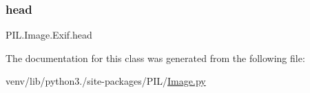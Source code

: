 \subsubsection{\texorpdfstring{head}{head}}
{\footnotesize\ttfamily P\+I\+L.\+Image.\+Exif.\+head}



The documentation for this class was generated from the following file\+:\begin{DoxyCompactItemize}
\item 
venv/lib/python3./site-\/packages/\+P\+I\+L/\hyperlink{Image_8py}{Image.\+py}\end{DoxyCompactItemize}
